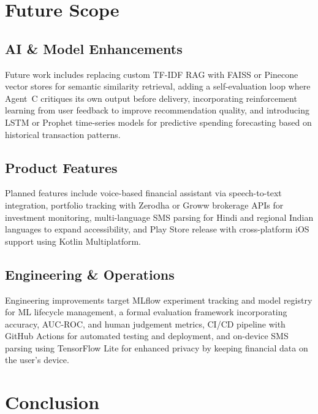 \documentclass[conference]{IEEEtran}
\begin{document}
\section{Future Scope}

\subsection{AI \& Model Enhancements}
Future work includes replacing custom TF-IDF RAG with FAISS or Pinecone vector stores for semantic similarity retrieval, adding a self-evaluation loop where Agent~C critiques its own output before delivery, incorporating reinforcement learning from user feedback to improve recommendation quality, and introducing LSTM or Prophet time-series models for predictive spending forecasting based on historical transaction patterns.

\subsection{Product Features}
Planned features include voice-based financial assistant via speech-to-text integration, portfolio tracking with Zerodha or Groww brokerage APIs for investment monitoring, multi-language SMS parsing for Hindi and regional Indian languages to expand accessibility, and Play Store release with cross-platform iOS support using Kotlin Multiplatform.

\subsection{Engineering \& Operations}
Engineering improvements target MLflow experiment tracking and model registry for ML lifecycle management, a formal evaluation framework incorporating accuracy, AUC-ROC, and human judgement metrics, CI/CD pipeline with GitHub Actions for automated testing and deployment, and on-device SMS parsing using TensorFlow Lite for enhanced privacy by keeping financial data on the user's device.

\section{Conclusion}
\end{document}
